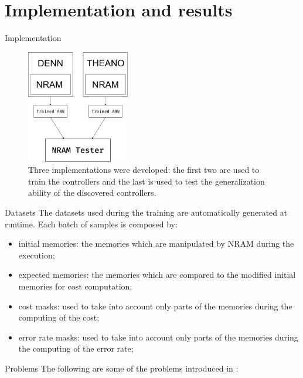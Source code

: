 \documentclass[xcolor={usenames}]{beamer}
\begin{document}
  \section{Implementation and results}
  \begin{frame}{Implementation}
  	\begin{figure}
  		\centering
  		\includegraphics[width=0.4\textwidth]{../figures/nram-implementation.png}
  		\caption{Three implementations were developed: the first two are used to train the controllers and the last is used to test the generalization ability of the discovered controllers.}
  	\end{figure}
  \end{frame}
  \begin{frame}{Datasets}
  	The datasets used during the training are automatically generated at runtime. Each batch of samples is composed by:
	\begin{itemize}
		\item{initial memories: the memories which are manipulated by NRAM during the execution;}
		\item{expected memories: the memories which are compared to the modified initial memories for cost computation;}
		\item{cost masks: used to take into account only parts of the memories during the computing of the cost;}
		\item{error rate masks: used to take into account only parts of the memories during the computing of the error rate;}
	\end{itemize}
  \end{frame}
  \begin{frame}{Problems}
  	The following are some of the problems introduced in \cite{NRAM:2016}:
  	\begin{itemize}
  	\end{itemize}
  \end{frame}
\end{document}
